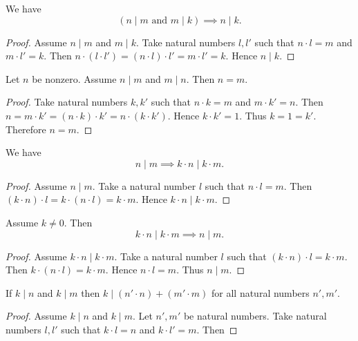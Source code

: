 \documentclass[../../natural-numbers.ftl.tex]{subfiles}
\begin{document}
\begin{forthel}
    \begin{proposition}[NN 03 01 364584]
      We have \[ (\text{$n \mid m$ and $m \mid k$}) \implies n \mid k. \]
    \end{proposition}
    \begin{proof}
      Assume $n \mid m$ and $m \mid k$.
      Take natural numbers $l,l'$ such that $n \cdot l = m$ and $m \cdot l' = k$.
      Then $n \cdot (l \cdot l') = (n \cdot l) \cdot l' = m \cdot l' = k$.
      Hence $n \mid k$.
    \end{proof}

    \begin{proposition}[NN 03 01 185910]
      Let $n$ be nonzero.
      Assume $n \mid m$ and $m \mid n$.
      Then $n = m$.
    \end{proposition}
    \begin{proof}
      Take natural numbers $k,k'$ such that $n \cdot k = m$ and $m \cdot k' = n$.
      Then $n = m \cdot k' = (n \cdot k) \cdot k' = n \cdot (k \cdot k')$.
      Hence $k \cdot k' = 1$.
      Thus $k = 1 = k'$.
      Therefore $n = m$.
    \end{proof}

    \begin{proposition}[NN 03 01 710814]
      We have \[ n \mid m \implies k \cdot n \mid k \cdot m. \]
    \end{proposition}
    \begin{proof}
      Assume $n \mid m$.
      Take a natural number $l$ such that $n \cdot l = m$.
      Then $(k \cdot n) \cdot l = k \cdot (n \cdot l) = k \cdot m$.
      Hence $k \cdot n \mid k \cdot m$.
    \end{proof}

    \begin{proposition}[NN 03 01 382863]
      Assume $k \neq 0$.
      Then \[ k \cdot n \mid k \cdot m \implies n \mid m. \]
    \end{proposition}
    \begin{proof}
      Assume $k \cdot n \mid k \cdot m$.
      Take a natural number $l$ such that $(k \cdot n) \cdot l = k \cdot m$.
      Then $k \cdot (n \cdot l) = k \cdot m$.
      Hence $n \cdot l = m$.
      Thus $n \mid m$.
    \end{proof}

    \begin{proposition}[NN 03 01 210721]
      If $k \mid n$ and $k \mid m$ then $k \mid (n' \cdot n) + (m' \cdot m)$ for all natural numbers $n',m'$.
    \end{proposition}
    \begin{proof}
      Assume $k \mid n$ and $k \mid m$.
      Let $n',m'$ be natural numbers.
      Take natural numbers $l,l'$ such that $k \cdot l = n$ and $k \cdot l' = m$.
      Then


\end{proof}
\end{forthel}
\end{document}
